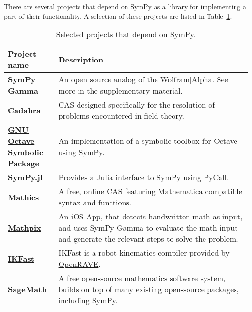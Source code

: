 There are several projects that depend on SymPy as a library for implementing
a part of their functionality. A selection of these projects are listed in
Table~\ref{projects-table}.

\begin{longtable}[htbc]{>{\raggedright}p{0.2\linewidth}p{0.8\linewidth}}
\caption{Selected projects that depend on SymPy.\label{projects-table}}\\
\toprule
\textbf{Project name} & \textbf{Description} \\
\midrule

\href{http://sympygamma.com/}{\textbf{SymPy Gamma}} & An open source
  analog of the Wolfram|Alpha.  See more in the supplementary material. \\

\href{http://cadabra.science/index.html}{\textbf{Cadabra}}~\cite{Peeters2007cadabra} &
  CAS designed specifically for the resolution of problems
  encountered in field theory. \\

\href{https://github.com/cbm755/octsympy}{\textbf{GNU Octave Symbolic Package}}~\cite{OctSymPy} &
  An implementation of a symbolic toolbox for Octave using SymPy. \\

\href{https://github.com/jverzani/SymPy.jl}{\textbf{SymPy.jl}}~\cite{SymPy.jl} &
  Provides a Julia interface to SymPy using PyCall. \\

\href{https://mathics.github.io/}{\textbf{Mathics}}~\cite{Mathics} &
  A free, online CAS featuring Mathematica compatible
  syntax and functions. \\

\href{http://mathpix.com/}{\textbf{Mathpix}}~\cite{Mathpix} & An iOS App, that detects handwritten math as input, and uses
  SymPy Gamma to evaluate the math input and generate the relevant
  steps to solve the problem. \\

\href{http://openrave.org/docs/latest_stable/openravepy/ikfast/}{\textbf{IKFast}}~\cite{diankov2010ikfast} &
  IKFast is a robot kinematics compiler provided by
  \href{http://openrave.org/}{OpenRAVE}. \\

\href{http://www.sagemath.org/}{\textbf{SageMath}}~\cite{sagemath} &
  A free open-source mathematics software system, builds on top of many
  existing open-source packages, including SymPy. \\


\end{longtable}
